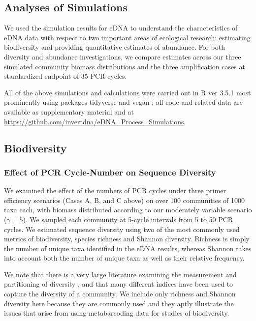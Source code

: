 \documentclass[fleqn,11pt,lineno]{wlscirep}
\begin{document}
\subsection*{Analyses of Simulations}

We used the simulation results for eDNA to understand the characteristics of eDNA data with respect to two important areas of ecological research: estimating biodiversity and providing quantitative estimates of abundance. For both diversity and abundance investigations, we compare estimates across our three simulated community biomass distributions and the three amplification cases at standardized endpoint of 35 PCR cycles.

All of the above simulations and calculations were carried out in R ver 3.5.1 \cite{r3.5.1} most prominently using packages tidyverse \cite{tidyverse} and vegan \cite{vegan}; all code and related data are available as supplementary material and at \url{https://github.com/invertdna/eDNA_Process_Simulations}. 

\subsection*{Biodiversity}

\subsubsection*{Effect of PCR Cycle-Number on Sequence Diversity}
We examined the effect of the numbers of PCR cycles under three primer efficiency scenarios (Cases A, B, and C above) on over 100 communities of 1000 taxa each, with biomass distributed according to our moderately variable scenario ($\gamma = 5$). We sampled each community at 5-cycle intervals from  5 to 50 PCR cycles. We estimated sequence diversity using two of the most commonly used metrics of biodiversity, species richness and Shannon diversity. Richness is simply the number of unique taxa identified in the eDNA results, whereas Shannon takes into account both the number of unique taxa as well as their relative frequency. 

We note that there is a very large literature examining the measurement and partitioning of diversity \cite{jost2007partitioning,chao2014unifying,hill1973diversity}, and that many different indices have been used to capture the diversity of a community. We include only richness and Shannon diversity here because they are commonly used and they aptly illustrate the issues that arise from using metabarcoding data for studies of biodiversity.
\end{document}
